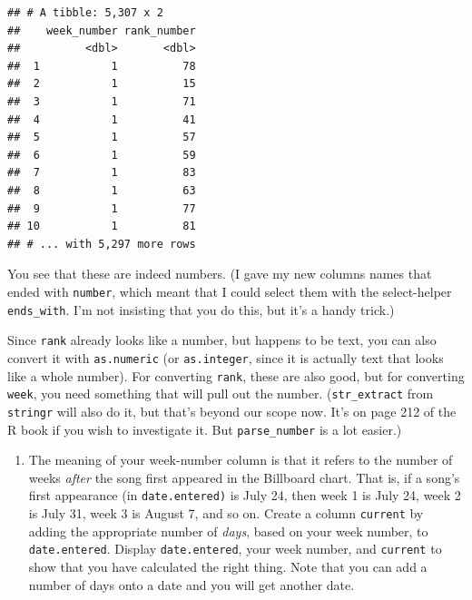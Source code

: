 \documentclass[]{tufte-book}
\newenvironment{Shaded}{}{}
\newcommand{\DataTypeTok}[1]{\textcolor[rgb]{0.56,0.13,0.00}{#1}}
\newcommand{\KeywordTok}[1]{\textcolor[rgb]{0.00,0.44,0.13}{\textbf{#1}}}
\newcommand{\NormalTok}[1]{#1}
\newcommand{\OperatorTok}[1]{\textcolor[rgb]{0.40,0.40,0.40}{#1}}
\newcommand{\StringTok}[1]{\textcolor[rgb]{0.25,0.44,0.63}{#1}}
\providecommand{\tightlist}{%
  \setlength{\itemsep}{0pt}\setlength{\parskip}{0pt}}
\theoremstyle{definition}
\theoremstyle{definition}
\theoremstyle{definition}
\theoremstyle{remark}
\begin{document}
\begin{Shaded}
\end{Shaded}

\begin{verbatim}
## # A tibble: 5,307 x 2
##    week_number rank_number
##          <dbl>       <dbl>
##  1           1          78
##  2           1          15
##  3           1          71
##  4           1          41
##  5           1          57
##  6           1          59
##  7           1          83
##  8           1          63
##  9           1          77
## 10           1          81
## # ... with 5,297 more rows
\end{verbatim}

You see that these are indeed numbers. (I gave my new columns names that
ended with \texttt{number}, which meant that I could select them with
the select-helper \texttt{ends\_with}. I'm not insisting that you do
this, but it's a handy trick.)

Since \texttt{rank} already looks like a number, but happens to be text,
you can also convert it with \texttt{as.numeric} (or
\texttt{as.integer}, since it is actually text that looks like a whole
number). For converting \texttt{rank}, these are also good, but for
converting \texttt{week}, you need something that will pull out the
number. (\texttt{str\_extract} from \texttt{stringr} will also do it,
but that's beyond our scope now. It's on page 212 of the R book if you
wish to investigate it. But \texttt{parse\_number} is a lot easier.)

\begin{enumerate}
\def\labelenumi{(\alph{enumi})}
\setcounter{enumi}{4}
\tightlist
\item
  The meaning of your week-number column is that it refers to the number
  of weeks \emph{after} the song first appeared in the Billboard chart.
  That is, if a song's first appearance (in \texttt{date.entered)} is
  July 24, then week 1 is July 24, week 2 is July 31, week 3 is August
  7, and so on. Create a column \texttt{current} by adding the
  appropriate number of \emph{days}, based on your week number, to
  \texttt{date.entered}. Display \texttt{date.entered}, your week
  number, and \texttt{current} to show that you have calculated the
  right thing. Note that you can add a number of days onto a date and
  you will get another date.
\end{enumerate}
\end{document}
